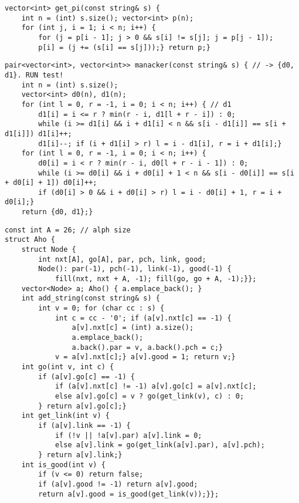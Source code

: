 \documentclass[12pt]{article}
\begin{document}
\begin{verbatim}
vector<int> get_pi(const string& s) {
    int n = (int) s.size(); vector<int> p(n);
    for (int j, i = 1; i < n; i++) {
        for (j = p[i - 1]; j > 0 && s[i] != s[j]; j = p[j - 1]);
        p[i] = (j += (s[i] == s[j]));} return p;}
\end{verbatim}

\begin{verbatim}
pair<vector<int>, vector<int>> manacker(const string& s) { // -> {d0, d1}. RUN test!
    int n = (int) s.size();
    vector<int> d0(n), d1(n);
    for (int l = 0, r = -1, i = 0; i < n; i++) { // d1
        d1[i] = i <= r ? min(r - i, d1[l + r - i]) : 0;
        while (i >= d1[i] && i + d1[i] < n && s[i - d1[i]] == s[i + d1[i]]) d1[i]++;
        d1[i]--; if (i + d1[i] > r) l = i - d1[i], r = i + d1[i];}
    for (int l = 0, r = -1, i = 0; i < n; i++) {
        d0[i] = i < r ? min(r - i, d0[l + r - i - 1]) : 0;
        while (i >= d0[i] && i + d0[i] + 1 < n && s[i - d0[i]] == s[i + d0[i] + 1]) d0[i]++;
        if (d0[i] > 0 && i + d0[i] > r) l = i - d0[i] + 1, r = i + d0[i];}
    return {d0, d1};}
\end{verbatim}

\begin{verbatim}
const int A = 26; // alph size
struct Aho {
    struct Node {
        int nxt[A], go[A], par, pch, link, good;
        Node(): par(-1), pch(-1), link(-1), good(-1) {
            fill(nxt, nxt + A, -1); fill(go, go + A, -1);}};
    vector<Node> a; Aho() { a.emplace_back(); }
    int add_string(const string& s) {
        int v = 0; for (char cc : s) {
            int c = cc - '0'; if (a[v].nxt[c] == -1) {
                a[v].nxt[c] = (int) a.size();
                a.emplace_back();
                a.back().par = v, a.back().pch = c;}
            v = a[v].nxt[c];} a[v].good = 1; return v;}
    int go(int v, int c) {
        if (a[v].go[c] == -1) {
            if (a[v].nxt[c] != -1) a[v].go[c] = a[v].nxt[c];
            else a[v].go[c] = v ? go(get_link(v), c) : 0;
        } return a[v].go[c];}
    int get_link(int v) {
        if (a[v].link == -1) {
            if (!v || !a[v].par) a[v].link = 0;
            else a[v].link = go(get_link(a[v].par), a[v].pch);
        } return a[v].link;}
    int is_good(int v) {
        if (v <= 0) return false;
        if (a[v].good != -1) return a[v].good;
        return a[v].good = is_good(get_link(v));}};
\end{verbatim}
\end{document}

